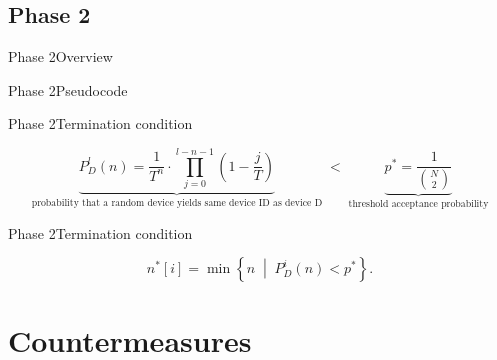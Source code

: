 \documentclass[aspectratio=169, hyperref={colorlinks=true, allcolors=SecondaryColor}, c]{beamer}
\begin{document}
\ifattackphasetwo
	\subsection{Phase 2}

	\begin{frame}[fragile]{Phase 2}{Overview}
		\vspace{0.5cm}

		\begin{adjustbox}{max width=\textwidth}
		\end{adjustbox}
	\end{frame}

	\begin{frame}[fragile]{Phase 2}{Pseudocode}
		\begin{center}
			\begin{adjustbox}{scale=0.7}
				
			\end{adjustbox}
		\end{center}
	\end{frame}

	\begin{frame}[fragile]{Phase 2}{Termination condition}
		\begin{center}
			\begin{adjustbox}{max width=\textwidth}
				\begin{minipage}[t]{\textwidth}
					\[
						\underbrace{
							P_D^l(n)
							=
							\frac{1}{T^n}
							\cdot
							\prod_{j=0}^{l - n - 1}
							\left(1 - \frac{j}{T}\right)
						}_{\text{probability that a random device yields same device ID as device D}}
						\;<\;
						\underbrace{
							p^* = \frac{1}{\binom{N}{2}}
						}_{\text{threshold acceptance probability}}
					\]
				\end{minipage}
			\end{adjustbox}
		\end{center}
	\end{frame}
	\begin{frame}[fragile]{Phase 2}{Termination condition}
		\begin{center}
		\end{center}
		\[
			n^*[i]
			=
			\min
			\left\{
			n
			\;\middle|\;
			P_D^i(n)
			<
			p^*
			\right\}.
		\]
	\end{frame}
\else
\fi

\ifcountermeasures
	\section{Countermeasures}
\end{document}
